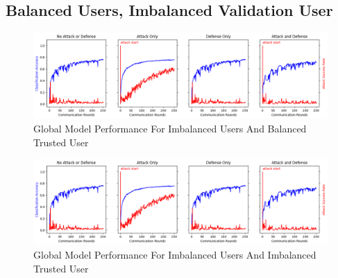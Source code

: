 \documentclass{article} %
\begin{document}
%
\subsection{Balanced Users, Imbalanced Validation User}
\label{sec.imbal_users}

\begin{figure}[H]
    \centering
    \includegraphics[width=\textwidth]{centralized/alpha1--alpha_val1/visuals/accuracy--n_malicious1--m_start1.png}
    \caption{Global Model Performance For Imbalanced Users And Balanced Trusted User}
    \label{fig:centralized--alpha1--alpha_val10000--accuracy--n_malicious1--m_start1}
\end{figure} 

\begin{figure}[H]
    \centering
    \includegraphics[width=\textwidth]{centralized/alpha1--alpha_val1/visuals/accuracy--n_malicious1--m_start1.png}
    \caption{Global Model Performance For Imbalanced Users And Imbalanced Trusted User}
    \label{fig:centralized--alpha1--alpha_val1--accuracy--n_malicious1--m_start1}
\end{figure} 
\end{document}
